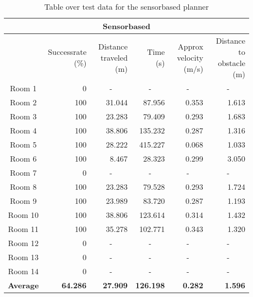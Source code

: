 \documentclass[../Head/Main.tex]{subfiles}
\begin{document}
\begin{table}[H]
	\begin{tabular}{| c | r | r | r | r | r |}
		\hline
		\multicolumn{6}{|c|}{\textbf{Sensorbased}} \\ \hline
		 & Successrate (\%) & Distance traveled (m) & Time (s) & Approx velocity (m/s) & Distance to obstacle (m) \\ \hline
		Room 1 & 0 & \multicolumn{1}{c|}{-} & \multicolumn{1}{c|}{-} & \multicolumn{1}{c|}{-} & \multicolumn{1}{c|}{-} \\ \hline
		Room 2 & 100 & 31.044 & 87.956 & 0.353 & 1.613 \\ \hline
		Room 3 & 100 & 23.283 & 79.409 & 0.293 & 1.683 \\ \hline
		Room 4 & 100 & 38.806 & 135.232 & 0.287 & 1.316 \\ \hline
		Room 5 & 100 & 28.222 & 415.227 & 0.068 & 1.033 \\ \hline
		Room 6 & 100 & 8.467 & 28.323 & 0.299 & 3.050 \\ \hline
		Room 7 & 0 & \multicolumn{1}{c|}{-} & \multicolumn{1}{c|}{-} & \multicolumn{1}{c|}{-} & \multicolumn{1}{c|}{-} \\ \hline
		Room 8 & 100 & 23.283 & 79.528 & 0.293 & 1.724 \\ \hline
		Room 9 & 100 & 23.989 & 83.720 & 0.287 & 1.193 \\ \hline
		Room 10 & 100 & 38.806 & 123.614 & 0.314 & 1.432 \\ \hline
		Room 11 & 100 & 35.278 & 102.771 & 0.343 & 1.320 \\ \hline
		Room 12 & 0 & \multicolumn{1}{c|}{-} & \multicolumn{1}{c|}{-} & \multicolumn{1}{c|}{-} & \multicolumn{1}{c|}{-} \\ \hline
		Room 13 & 0 & \multicolumn{1}{c|}{-} & \multicolumn{1}{c|}{-} & \multicolumn{1}{c|}{-} & \multicolumn{1}{c|}{-} \\ \hline
		Room 14 & 0 & \multicolumn{1}{c|}{-} & \multicolumn{1}{c|}{-} & \multicolumn{1}{c|}{-} & \multicolumn{1}{c|}{-} \\ \hline
		\textbf{Average} & \textbf{64.286} & \textbf{27.909} & \textbf{126.198} & \textbf{0.282} & \textbf{1.596} \\ \hline
\end{tabular}
\caption{Table over test data for the sensorbased planner}
\label{tab:Sensorbased}
\end{table}
\end{document}
